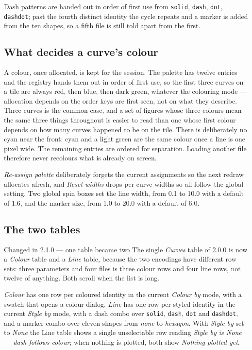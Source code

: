 \documentclass[11pt,a4paper,oneside]{report}
\newcommand{\code}[1]{\texttt{#1}}
\begin{document}
Dash patterns are handed out in order of first use from \code{solid},
\code{dash}, \code{dot}, \code{dashdot}; past the fourth distinct identity the
cycle repeats and a marker is added from the ten shapes, so a fifth file is
still told apart from the first.

\subsection{What decides a curve's colour}

A colour, once allocated, is kept for the session. The palette has twelve entries
and the registry hands them out in order of first use, so the first three curves
on a tile are always red, then blue, then dark green, whatever the colouring mode
--- allocation depends on the order keys are first seen, not on what they
describe. Three curves is the common case, and a set of figures whose three
colours mean the same three things throughout is easier to read than one whose
first colour depends on how many curves happened to be on the tile. There is
deliberately no cyan near the front: cyan and a light green are the same colour
once a line is one pixel wide. The remaining entries are ordered for separation.
Loading another file therefore never recolours what is already on screen.

\emph{Re-assign palette} deliberately forgets the current assignments so the next
redraw allocates afresh, and \emph{Reset widths} drops per-curve widths so all
follow the global setting. Two global spin boxes set the line width, from 0.1 to
10.0 with a default of 1.6, and the marker size, from 1.0 to 20.0 with a default
of 6.0.

\subsection{The two tables}

\begin{aoenew}{Changed in 2.1.0 --- one table became two}
The single \emph{Curves} table of 2.0.0 is now a \emph{Colour} table and a
\emph{Line} table, because the two encodings have different row sets: three
parameters and four files is three colour rows and four line rows, not twelve of
anything. Both scroll when the list is long.
\end{aoenew}

\emph{Colour} has one row per coloured identity in the current \emph{Colour by}
mode, with a swatch that opens a colour dialog. \emph{Line} has one row per
styled identity in the current \emph{Style by} mode, with a dash combo over
\code{solid}, \code{dash}, \code{dot} and \code{dashdot}, and a marker combo over
eleven shapes from \emph{none} to \emph{hexagon}. With \emph{Style by} set to
\emph{None} the Line table shows a single unselectable row reading \emph{Style by
is None --- dash follows colour}; when nothing is plotted, both show
\emph{Nothing plotted yet}.
\end{document}
